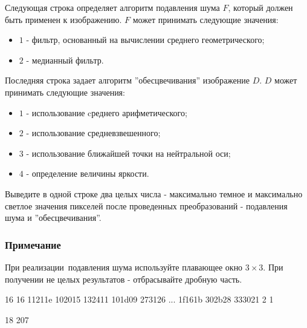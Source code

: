 Следующая строка определяет алгоритм подавления шума $F$, который должен быть применен к изображению. $F$ может принимать следующие значения:

\begin{itemize}
    \item $1$ - фильтр, основанный на вычислении среднего геометрического;
    \item $2$ - медианный фильтр.
\end{itemize}

Последняя строка задает алгоритм ''обесцвечивания'' изображение $D$. $D$ может принимать следующие значения:

\begin{itemize}
    \item $1$ - использование cреднего арифметического;
    \item $2$ - использование средневзвешенного;
    \item $3$ - использование ближайшей точки на нейтральной оси;
    \item $4$ - определение величины яркости.
\end{itemize}

\newpage

\outputfmtSection

Выведите в одной строке два целых числа - максимально темное и максимально светлое значения пикселей после проведенных преобразований - подавления шума и ''обесцвечивания''.

\subsubsection*{Примечание}

При реализации подавления шума используйте плавающее окно $3 \times 3$. При получении не целых результатов - отбрасывайте дробную часть.

\begin{myverbbox}[\small]{\vinput}
    16 16
    11211e 102015 132411 101d09 273126 ... 1f161b 302b28 333021
    2
    1
\end{myverbbox}
\begin{myverbbox}[\small]{\voutput}
    18 207
\end{myverbbox}

